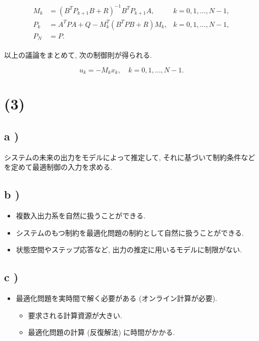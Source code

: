 \documentclass[10pt, fleqn, dvipdfmx]{article}
\begin{document}
\begin{align}
	\begin{aligned}
		M_k & = (B^T P_{k+1} B + R)^{-1} B^T P_{k+1} A,
		    & k = 0, 1, \dots, N-1,                     \\
		P_k & = A^T P A + Q - M_k^T (B^T P B + R) M_k,
		    & k = 0, 1, \dots, N-1,                     \\
		P_N & = P.
	\end{aligned}
	\label{fom2-6}
\end{align}

以上の議論をまとめて, 次の制御則が得られる.

\begin{equation}
	u_k = - M_k x_k, \quad k = 0, 1, \dots, N-1.
\end{equation}

\section*{(3)}

\subsection*{a )}

システムの未来の出力をモデルによって推定して,
それに基づいて制約条件などを定めて最適制御の入力を求める.

\subsection*{b )}

\begin{itemize}
	\item 複数入出力系を自然に扱うことができる.
	\item システムのもつ制約を最適化問題の制約として自然に扱うことができる.
	\item 状態空間やステップ応答など, 出力の推定に用いるモデルに制限がない.
\end{itemize}

\subsection*{c )}

\begin{itemize}
	\item 最適化問題を実時間で解く必要がある (オンライン計算が必要).
	      \begin{itemize}
		      \item 要求される計算資源が大きい.
		      \item 最適化問題の計算 (反復解法) に時間がかかる.
	      \end{itemize}
\end{itemize}
\end{document}
